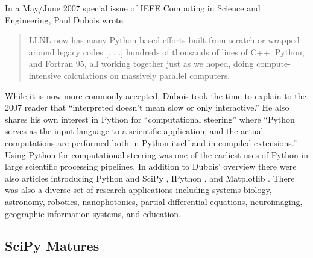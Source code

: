 \documentclass[fleqn,10pt]{wlscirep}
\begin{document}
In a May/June 2007 special issue of IEEE Computing in Science and
Engineering, Paul Dubois wrote\cite{dubois2007guest}:
\begin{quote}
LLNL now has many Python-based efforts built from scratch or wrapped around
legacy codes [. . .] hundreds of thousands
of lines of C++, Python, and Fortran 95, all working together just as we hoped,
doing compute-intensive calculations on massively parallel computers.
\end{quote}
While it is now more commonly accepted, Dubois took the time to explain to
the 2007 reader that ``interpreted doesn't mean slow or only interactive.''
He also shares his own interest in Python for ``computational steering''
where ``Python serves as the input language to a scientific application, and the actual
computations are performed both in Python itself and in compiled extensions.''
Using Python for computational steering was one of the earliest uses of Python
in large scientific processing pipelines.
In addition to Dubois' overview there were also articles introducing
Python and SciPy \cite{oliphant2007python}, IPython \cite{perez2007ipython},
and  Matplotlib \cite{hunter2007matplotlib}.
There was also a diverse set of
research applications including
systems biology\cite{myers2007python},
astronomy\cite{greenfield2007reaching},
robotics\cite{krauss2007python},
nanophotonics\cite{bienstman2007python},
partial differential equations\cite{mardal2007using},
neuroimaging\cite{millman2007analysis},
geographic information systems\cite{shi2007python}, and
education\cite{backer2007computational, myers2007pythona}.


\subsection*{SciPy Matures}
\end{document}
